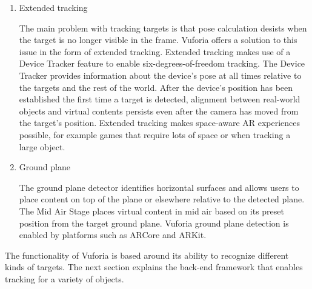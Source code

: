 \begin{enumerate}
\begin{figure}[!ht]
\end{figure}
\vspace{-.1 in}

\item Extended tracking

The main problem with tracking targets is that pose calculation desists when the target is no longer visible in the frame. Vuforia offers a solution to this issue in the form of extended tracking. Extended tracking makes use of a Device Tracker feature to enable six-degrees-of-freedom tracking. The Device Tracker provides information about the device's pose at all times relative to the targets and the rest of the world. After the device's position has been established the first time a target is detected, alignment between real-world objects and virtual contents persists even after the camera has moved from the target's position. Extended tracking makes space-aware AR experiences possible, for example games that require lots of space or when tracking a large object.

\item Ground plane

The ground plane detector identifies horizontal surfaces and allows users to place content on top of the plane or elsewhere relative to the detected plane. The Mid Air Stage places virtual content in mid air based on its preset position from the target ground plane. Vuforia ground plane detection is enabled by platforms such as ARCore and ARKit.

\end{enumerate}

The functionality of Vuforia is based around its ability to recognize different kinds of targets. The next section explains the back-end framework that enables tracking for a variety of objects.

